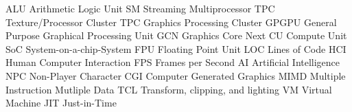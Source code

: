 \usepackage[acronyms, nonumberlist, shortcuts]{glossaries}
\makeglossaries


 {ALU} {Arithmetic Logic Unit}
 {SM} {Streaming Multiprocessor}
 {TPC} {Texture/Processor Cluster}
 {TPC} {Graphics Processing Cluster}
 {GPGPU} {General Purpose Graphical Processing Unit}
 {GCN} {Graphics Core Next}
 {CU} {Compute Unit}
 {SoC} {System-on-a-chip-System}
 {FPU} {Floating Point Unit}
 {LOC} {Lines of Code}
 {HCI} {Human Computer Interaction}
 {FPS} {Frames per Second}
 {AI} {Artificial Intelligence}
 {NPC} {Non-Player Character}
 {CGI} {Computer Generated Graphics}
 {MIMD} {Multiple Instruction Mutliple Data}
 {TCL} {Transform, clipping, and lighting}
 {VM} {Virtual Machine}
 {JIT} {Just-in-Time}
